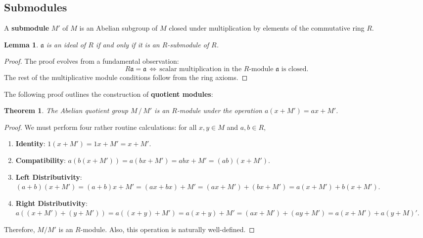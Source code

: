 \documentclass[11pt]{article}
\newtheorem{theorem}{Theorem}
\newtheorem{lemma}{Lemma}
\begin{document}

\subsection{Submodules}

A \textbf{submodule} $M'$ of $M$ is an Abelian subgroup of $M$ closed under multiplication by elements of the commutative ring $R$. 

\begin{adjustwidth}{0.5cm}{}
  \begin{lemma}
    $\mathfrak{a}$ is an ideal of $R$ if and only if it is an $R$-submodule of $R$.
  \end{lemma}
  \begin{proof}
    The proof evolves from a fundamental observation:
    \[
      R \mathfrak{a} = \mathfrak{a} \, \iff \, \text{scalar multiplication in the $R$-module $\mathfrak{a}$ is closed}.
    \]
    The rest of the multiplicative module conditions follow from the ring axioms.
  \end{proof}
\end{adjustwidth}

The following proof outlines the construction of \textbf{quotient modules}:

\begin{adjustwidth}{0.5cm}{}
	\begin{theorem}
		The Abelian quotient group $M \, / \, M'$ is an $R$-module under the operation $a(x + M') = ax + M'$.
	\end{theorem}
	\begin{proof}
		We must perform four rather routine calculations: for all $x, y \in M$ and $a, b \in R$,
		\begin{enumerate}
      \item \textbf{Identity}: $1(x + M') = 1x + M' = x + M'$.
      \item \textbf{Compatibility}: $a(b(x + M')) = a(bx + M') = abx + M' = (ab)(x + M')$.
			\item \textbf{Left Distributivity}: $(a + b)(x + M') = (a + b)x + M' = (ax + bx) + M' = (ax + M') + (bx + M') = a(x + M') + b(x + M')$.
			\item \textbf{Right Distributivity}: $a((x + M') + (y + M')) = a((x + y) + M') = a(x + y) + M' = (ax + M') + (ay + M') = a(x + M') + a(y + M)'$.
		\end{enumerate}
		Therefore, $M / M'$ is an $R$-module. Also, this operation is naturally well-defined.
	\end{proof}
\end{adjustwidth}
\end{document}
